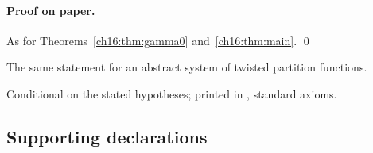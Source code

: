 \paragraph{Proof on paper.}  As for Theorems~\ref{ch16:thm:gamma0} and~\ref{ch16:thm:main}. \qed
\begin{physics}
The same statement for an abstract system of twisted partition functions.
\end{physics}
\begin{status}
Conditional on the stated hypotheses; printed in , standard
axioms.
\end{status}

\subsection{Supporting declarations}

